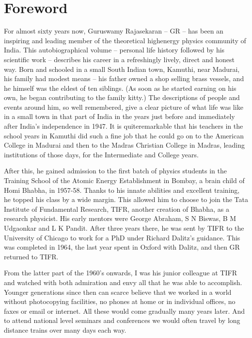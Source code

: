 \chapter{Foreword}


For almost sixty years now, Guruswamy Rajasekaran – GR – has been an 
inspiring and leading member of the theoretical high\break energy physics 
community of India. This autobiographical volume – personal life 
history followed by his scientific work – describes his career in a 
refreshingly lively, direct and honest way. Born and schooled in a 
small South Indian town, Kamuthi, near Madurai, his family had modest 
means – his father owned a shop selling brass vessels, and he himself 
was the eldest of ten siblings. (As soon as he started earning on his 
own, he began contributing to the family kitty.) The descriptions of 
people and events around him, so well remembered, give a clear picture 
of what life was like in a small town in that part of India in the 
years just before and immediately after India’s independence in 1947. It 
is quite\break remarkable that his teachers in the school years in Kamuthi 
did such a fine job that he could go on to the American College in 
Madurai and then to the Madras Christian College in Madras, leading 
institutions of those days, for the Intermediate and Colleg\-e years.

After this, he gained admission to the first batch of physics studen\-ts 
in the Training School of the Atomic Energy Establish\-ment in Bombay, a 
brain child of Homi Bhabha, in 1957-58. Thanks to his innate abilities 
and excellent training, he topped his class by a wide margin. This 
allowed him to choose to join the Tata Institute of Fundamental 
Research, TIFR, another crea\-tion of Bhabha, as a research physicist. 
His early mentors were George Abraham, S N Biswas, B M Udgaonkar and L 
K Pandit. After three years there, he was sent by TIFR to the 
University of Chicago to work for a PhD under Richard Dalitz’s 
guidance. This was completed in 1964, the last year spent in Oxford 
with Dalitz, and then GR returned to TIFR.
\eject

From the latter part of the 1960’s onwards, I was his junior colleague 
at TIFR and watched with both admiration and envy all that he was able 
to accomplish. Younger generations since then can scarce believe that 
we worked in a world without photocopying facilities, no phones at home 
or in individual offices, no faxes or email or internet. All these 
would come gradually many years later. And to attend national level 
seminars and conferences we would often travel by long distance trains 
over many days each way.

